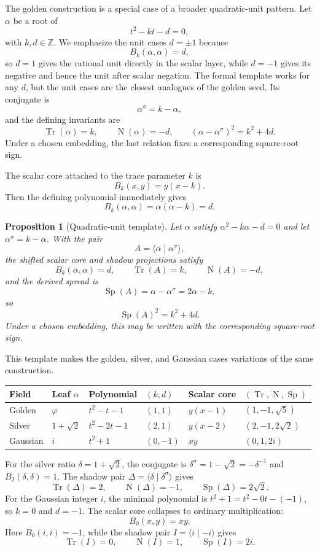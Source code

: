 \documentclass[11pt]{article}
\newtheorem{proposition}[definition]{Proposition}
\newcommand{\Tr}{\operatorname{Tr}}
\newcommand{\Nm}{\operatorname{N}}
\newcommand{\Sp}{\operatorname{Sp}}
\newcommand{\sig}{\sigma}
\newcommand{\ph}{\varphi}
\newcommand{\Z}{\mathbb{Z}}
\begin{document}
The golden construction is a special case of a broader quadratic-unit pattern.  Let $\alpha$ be a root of
\[
    t^2-kt-d=0,
\]
with $k,d\in\Z$.  We emphasize the unit cases $d=\pm1$ because
\[
    B_k(\alpha,\alpha)=d,
\]
so $d=1$ gives the rational unit directly in the scalar layer, while $d=-1$ gives its negative and hence the unit after scalar negation.  The formal template works for any $d$, but the unit cases are the closest analogues of the golden seed.  Its conjugate is
\[
    \alpha^\sig=k-\alpha,
\]
and the defining invariants are
\[
    \Tr(\alpha)=k,
    \qquad
    \Nm(\alpha)=-d,
    \qquad
    (\alpha-\alpha^\sig)^2=k^2+4d.
\]
Under a chosen embedding, the last relation fixes a corresponding square-root sign.

The scalar core attached to the trace parameter $k$ is
\[
    B_k(x,y)=y(x-k).
\]
Then the defining polynomial immediately gives
\[
    B_k(\alpha,\alpha)=\alpha(\alpha-k)=d.
\]

\begin{proposition}[Quadratic-unit template]\label{prop:quadratic-template}
Let $\alpha$ satisfy $\alpha^2-k\alpha-d=0$ and let $\alpha^\sig=k-\alpha$.  With the pair
\[
    A=\langle \alpha\mid \alpha^\sig\rangle,
\]
the shifted scalar core and shadow projections satisfy
\[
    B_k(\alpha,\alpha)=d,
    \qquad
    \Tr(A)=k,
    \qquad
    \Nm(A)=-d,
\]
and the derived spread is
\[
    \Sp(A)=\alpha-\alpha^\sig=2\alpha-k,
\]
so
\[
    \Sp(A)^2=k^2+4d.
\]
Under a chosen embedding, this may be written with the corresponding square-root sign.
\end{proposition}

This template makes the golden, silver, and Gaussian cases variations of the same construction.

\begin{center}
\begin{tabular}{llllll}
\toprule
Field & Leaf $\alpha$ & Polynomial & $(k,d)$ & Scalar core & $(\Tr,\Nm,\Sp)$ \\
\midrule
Golden & $\ph$ & $t^2-t-1$ & $(1,1)$ & $y(x-1)$ & $(1,-1,\sqrt5)$ \\
Silver & $1+\sqrt2$ & $t^2-2t-1$ & $(2,1)$ & $y(x-2)$ & $(2,-1,2\sqrt2)$ \\
Gaussian & $i$ & $t^2+1$ & $(0,-1)$ & $xy$ & $(0,1,2i)$ \\
\bottomrule
\end{tabular}
\end{center}

For the silver ratio $\delta=1+\sqrt2$, the conjugate is $\delta^\sig=1-\sqrt2=-\delta^{-1}$ and $B_2(\delta,\delta)=1$.  The shadow pair $\Delta=\langle\delta\mid\delta^\sig\rangle$ gives
\[
    \Tr(\Delta)=2,
    \qquad
    \Nm(\Delta)=-1,
    \qquad
    \Sp(\Delta)=2\sqrt2.
\]
For the Gaussian integer $i$, the minimal polynomial is $t^2+1=t^2-0t-(-1)$, so $k=0$ and $d=-1$.  The scalar core collapses to ordinary multiplication:
\[
    B_0(x,y)=xy.
\]
Here $B_0(i,i)=-1$, while the shadow pair $I=\langle i\mid -i\rangle$ gives
\[
    \Tr(I)=0,
    \qquad
    \Nm(I)=1,
    \qquad
    \Sp(I)=2i.
\]
\end{document}
